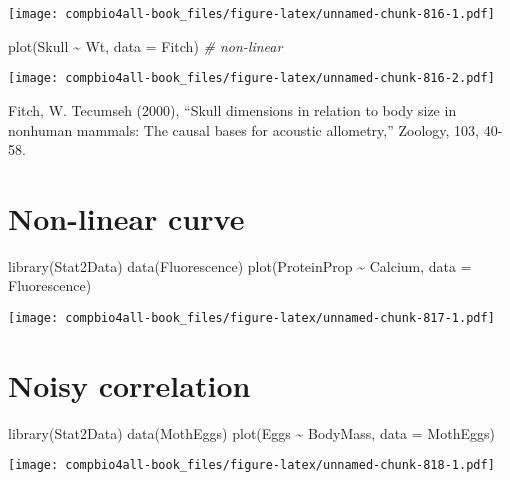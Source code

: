 \documentclass[
]{book}
\newenvironment{Shaded}{\begin{snugshade}}{\end{snugshade}}
\newcommand{\AttributeTok}[1]{\textcolor[rgb]{0.77,0.63,0.00}{#1}}
\newcommand{\CommentTok}[1]{\textcolor[rgb]{0.56,0.35,0.01}{\textit{#1}}}
\newcommand{\FunctionTok}[1]{\textcolor[rgb]{0.00,0.00,0.00}{#1}}
\newcommand{\NormalTok}[1]{#1}
\newcommand{\SpecialCharTok}[1]{\textcolor[rgb]{0.00,0.00,0.00}{#1}}
\begin{document}
\texttt{[image: compbio4all-book\_files/figure-latex/unnamed-chunk-816-1.pdf]}

\begin{Shaded}
\begin{Highlighting}[]
\FunctionTok{plot}\NormalTok{(Skull }\SpecialCharTok{\textasciitilde{}}\NormalTok{ Wt, }\AttributeTok{data =}\NormalTok{ Fitch)     }\CommentTok{\# non{-}linear}
\end{Highlighting}
\end{Shaded}

\texttt{[image: compbio4all-book\_files/figure-latex/unnamed-chunk-816-2.pdf]}

Fitch, W. Tecumseh (2000), ``Skull dimensions in relation to body size in nonhuman mammals: The causal bases for acoustic allometry,'' Zoology, 103, 40-58.

\hypertarget{non-linear-curve}{%
\section{Non-linear curve}\label{non-linear-curve}}

\begin{Shaded}
\begin{Highlighting}[]
\FunctionTok{library}\NormalTok{(Stat2Data)}
\FunctionTok{data}\NormalTok{(Fluorescence)}
\FunctionTok{plot}\NormalTok{(ProteinProp }\SpecialCharTok{\textasciitilde{}}\NormalTok{ Calcium, }\AttributeTok{data =}\NormalTok{ Fluorescence)}
\end{Highlighting}
\end{Shaded}

\texttt{[image: compbio4all-book\_files/figure-latex/unnamed-chunk-817-1.pdf]}

\hypertarget{noisy-correlation}{%
\section{Noisy correlation}\label{noisy-correlation}}

\begin{Shaded}
\begin{Highlighting}[]
\FunctionTok{library}\NormalTok{(Stat2Data)}
\FunctionTok{data}\NormalTok{(MothEggs)}
\FunctionTok{plot}\NormalTok{(Eggs }\SpecialCharTok{\textasciitilde{}}\NormalTok{ BodyMass, }\AttributeTok{data =}\NormalTok{ MothEggs)}
\end{Highlighting}
\end{Shaded}

\texttt{[image: compbio4all-book\_files/figure-latex/unnamed-chunk-818-1.pdf]}
\end{document}
